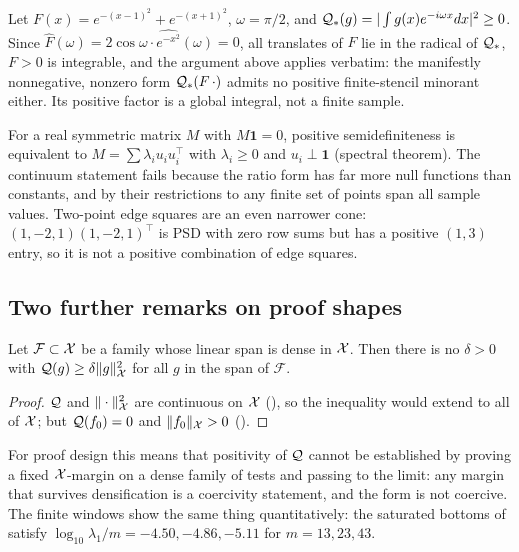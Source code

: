 \begin{example}\label{ex:control}
Let $F(x)=e^{-(x-1)^2}+e^{-(x+1)^2}$, $\omega=\pi/2$, and $\mathcal Q_*(g)=|\int g(x)e^{-i\omega x}dx|^2\ge0$. Since
$\widehat F(\omega)=2\cos\omega\cdot\widehat{e^{-x^2}}(\omega)=0$, all translates of $F$ lie in the radical of $\mathcal Q_*$, $F>0$ is
integrable, and the argument above applies verbatim: the manifestly nonnegative, nonzero form $\mathcal Q_*(F\,\cdot)$ admits no
positive finite-stencil minorant either. Its positive factor is a global integral, not a finite sample.
\end{example}

\begin{remark}
For a real symmetric matrix $M$ with $M\mathbf 1=0$, positive semidefiniteness is equivalent to $M=\sum\lambda_iu_iu_i^{\!\top}$
with $\lambda_i\ge0$ and $u_i\perp\mathbf 1$ (spectral theorem). The continuum statement fails because the ratio form has far
more null functions than constants, and by  their restrictions to any finite set of points span all sample
values. Two-point edge squares are an even narrower cone: $(1,-2,1)(1,-2,1)^{\!\top}$ is PSD with zero row sums but has a
positive $(1,3)$ entry, so it is not a positive combination of edge squares.
\end{remark}

\subsection{Two further remarks on proof shapes}\label{sec:trade}

\begin{proposition}\label{prop:trade}
Let $\mathcal F\subset\mathcal X$ be a family whose linear span is dense in $\mathcal X$. Then there is no $\delta>0$ with
$\mathcal Q(g)\ge\delta\|g\|_{\mathcal X}^2$ for all $g$ in the span of $\mathcal F$.
\end{proposition}
\begin{proof}
$\mathcal Q$ and $\|\cdot\|_{\mathcal X}^2$ are continuous on $\mathcal X$ (), so the inequality would extend to all of $\mathcal X$; but
$\mathcal Q(f_0)=0$ and $\|f_0\|_{\mathcal X}>0$ ().
\end{proof}
For proof design this means that positivity of $\mathcal Q$ cannot be established by proving a fixed $\mathcal X$-margin on a dense family
of tests and passing to the limit: any margin that survives densification is a coercivity statement, and the form is not coercive. The
finite windows show the same thing quantitatively: the saturated bottoms of  satisfy $\log_{10}\lambda_1/m=-4.50,-4.86,-5.11$ for
$m=13,23,43$.

